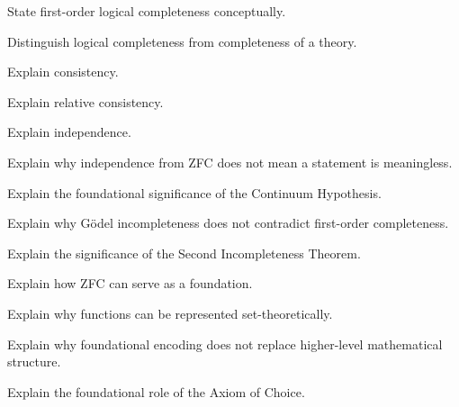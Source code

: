 \begin{exercise}[2]
State first-order logical completeness conceptually.
\end{exercise}

\begin{exercise}[3]
Distinguish logical completeness from completeness of a theory.
\end{exercise}

\begin{exercise}[2]
Explain consistency.
\end{exercise}

\begin{exercise}[2]
Explain relative consistency.
\end{exercise}

\begin{exercise}[2]
Explain independence.
\end{exercise}

\begin{exercise}[3]
Explain why independence from ZFC does not mean a statement is meaningless.
\end{exercise}

\begin{exercise}[3]
Explain the foundational significance of the Continuum Hypothesis.
\end{exercise}

\begin{exercise}[3]
Explain why Gödel incompleteness does not contradict first-order
completeness.
\end{exercise}

\begin{exercise}[3]
Explain the significance of the Second Incompleteness Theorem.
\end{exercise}

\begin{exercise}[2]
Explain how ZFC can serve as a foundation.
\end{exercise}

\begin{exercise}[3]
Explain why functions can be represented set-theoretically.
\end{exercise}

\begin{exercise}[3]
Explain why foundational encoding does not replace higher-level mathematical
structure.
\end{exercise}

\begin{exercise}[2]
Explain the foundational role of the Axiom of Choice.
\end{exercise}

